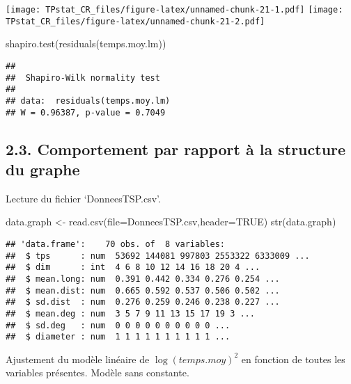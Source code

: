 \documentclass[
]{article}
\newenvironment{Shaded}{\begin{snugshade}}{\end{snugshade}}
\newcommand{\AttributeTok}[1]{\textcolor[rgb]{0.77,0.63,0.00}{#1}}
\newcommand{\ConstantTok}[1]{\textcolor[rgb]{0.00,0.00,0.00}{#1}}
\newcommand{\FunctionTok}[1]{\textcolor[rgb]{0.00,0.00,0.00}{#1}}
\newcommand{\NormalTok}[1]{#1}
\newcommand{\OtherTok}[1]{\textcolor[rgb]{0.56,0.35,0.01}{#1}}
\newcommand{\StringTok}[1]{\textcolor[rgb]{0.31,0.60,0.02}{#1}}
\begin{document}
\texttt{[image: TPstat\_CR\_files/figure-latex/unnamed-chunk-21-1.pdf]}
\texttt{[image: TPstat\_CR\_files/figure-latex/unnamed-chunk-21-2.pdf]}

\begin{Shaded}
\begin{Highlighting}[]
\FunctionTok{shapiro.test}\NormalTok{(}\FunctionTok{residuals}\NormalTok{(temps.moy.lm))}
\end{Highlighting}
\end{Shaded}

\begin{verbatim}
## 
##  Shapiro-Wilk normality test
## 
## data:  residuals(temps.moy.lm)
## W = 0.96387, p-value = 0.7049
\end{verbatim}

\hypertarget{comportement-par-rapport-uxe0-la-structure-du-graphe}{%
\subsection{2.3. Comportement par rapport à la structure du
graphe}\label{comportement-par-rapport-uxe0-la-structure-du-graphe}}

Lecture du fichier `DonneesTSP.csv'.

\begin{Shaded}
\begin{Highlighting}[]
\NormalTok{data.graph }\OtherTok{\textless{}{-}} \FunctionTok{read.csv}\NormalTok{(}\AttributeTok{file=}\StringTok{\textquotesingle{}DonneesTSP.csv\textquotesingle{}}\NormalTok{,}\AttributeTok{header=}\ConstantTok{TRUE}\NormalTok{)}
\FunctionTok{str}\NormalTok{(data.graph)}
\end{Highlighting}
\end{Shaded}

\begin{verbatim}
## 'data.frame':    70 obs. of  8 variables:
##  $ tps      : num  53692 144081 997803 2553322 6333009 ...
##  $ dim      : int  4 6 8 10 12 14 16 18 20 4 ...
##  $ mean.long: num  0.391 0.442 0.334 0.276 0.254 ...
##  $ mean.dist: num  0.665 0.592 0.537 0.506 0.502 ...
##  $ sd.dist  : num  0.276 0.259 0.246 0.238 0.227 ...
##  $ mean.deg : num  3 5 7 9 11 13 15 17 19 3 ...
##  $ sd.deg   : num  0 0 0 0 0 0 0 0 0 0 ...
##  $ diameter : num  1 1 1 1 1 1 1 1 1 1 ...
\end{verbatim}

Ajustement du modèle linéaire de \(\log(temps.moy)^2\) en fonction de
toutes les variables présentes. Modèle sans constante.
\end{document}
